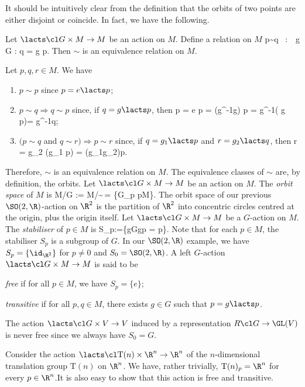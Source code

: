 It should be intuitively clear from the definition that the orbits of two points are either disjoint or coincide. In fact, we have the following.

\bp
Let $\lacts \cl G\times M \to M$ be an action on $M$. Define a relation on $M$
\bse
p\sim q \ :\Leftrightarrow \ \exists \, g \in G : q = g \lacts p.
\ese
Then $\sim$ is an equivalence relation on $M$.
\ep

\bq
Let $p,q,r\in M$. We have
\begin{enumerate}[label=\roman*)]
\item $p\sim p$ since $p = e \lacts p$;
\item $p\sim q \Rightarrow q\sim p$ since, if $q =g \lacts p$, then
\bse
p = e \lacts p = (g^{-1}\bullet g) \lacts p = g^{-1}\lacts( g \lacts p)= g^{-1}\lacts q; 
\ese
\item $(p\sim q$ and $q\sim r) \Rightarrow p\sim r$ since, if $q =g_1 \lacts p$ and $r =g_2 \lacts q$, then
\bse
r = g_2 \lacts (g_1 \lacts p) = (g_1\bullet g_2)\lacts p.
\ese
\end{enumerate}
Therefore, $\sim$ is an equivalence relation on $M$.
\eq
The equivalence classes of $\sim$ are, by definition, the orbits.
\bd
Let $\lacts\cl G\times M\to M$ be an action on $M$. The \emph{orbit space} of $M$ is
\bse
M/G := M/\!\sim \,= \{G_p \mid p\in M\}.
\ese
\ed
\be
The orbit space of our previous $\SO(2,\R)$-action on $\R^2$ is the partition of $\R^2$ into concentric circles centred at the origin, plus the origin itself.
\ee
\bd
Let $\lacts\cl G\times M\to M$ be a $G$-action on $M$. The \emph{stabiliser} of $p\in M$ is
\bse
S_p:=\{g\in G\mid g\lacts p = p\}.
\ese
\ed
Note that for each $p\in M$, the stabiliser $S_p$ is a subgroup of $G$.
\be
In our $\SO(2,\R)$ example, we have $S_p=\{\id_{\R^2}\}$ for $p\neq 0$ and $S_0=\SO(2,\R)$.
\ee
\bd
A left $G$-action $\lacts\cl G\times M\to M$ is said to be
\ben[label=\roman*)]
\item \emph{free} if for all $p\in M$, we have $S_p=\{e\}$;
\item \emph{transitive} if for all $p,q\in M$, there exists $g\in G$ such that $p=g\lacts p$.
\een
\ed

\be
The action $\lacts\cl G\times V \to V$ induced by a representation $R\cl G\to \GL(V)$ is never free since we always have $S_0=G$.
\ee

\be
Consider the action $\lacts\cl \mathrm{T}(n)\times \R^n\to \R^n$ of the $n$-dimensional translation group $\mathrm{T}(n)$ on $\R^n$. We have, rather trivially, $\mathrm{T}(n)_p=\R^n$ for every $p\in \R^n$.It is also easy to show that this action is free and transitive. 
\ee

